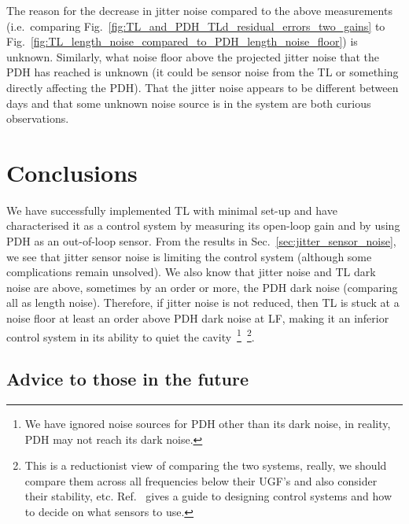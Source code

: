\documentclass[aps,pra,superscriptaddress,reprint,nofootinbib]{revtex4-1}
\begin{document}
The reason for the decrease in jitter noise compared to the above measurements (i.e.\ comparing Fig.~\ref{fig:TL_and_PDH_TLd_residual_errors_two_gains} to Fig.~\ref{fig:TL_length_noise_compared_to_PDH_length_noise_floor}) is unknown. Similarly, what noise floor above the projected jitter noise that the PDH has reached is unknown (it could be sensor noise from the TL or something directly affecting the PDH). That the jitter noise appears to be different between days and that some unknown noise source is in the system are both curious observations.


\section{Conclusions}
\label{sec:conclusions}

We have successfully implemented TL with minimal set-up and have characterised it as a control system by measuring its open-loop gain and by using PDH as an out-of-loop sensor. From the results in Sec.~\ref{sec:jitter_sensor_noise}, we see that jitter sensor noise is limiting the control system (although some complications remain unsolved). We also know that jitter noise and TL dark noise are above, sometimes by an order or more, the PDH dark noise (comparing all as length noise).
Therefore, if jitter noise is not reduced, then TL is stuck at a noise floor at least an order above PDH dark noise at LF, making it an inferior control system in its ability to quiet the cavity~\footnote{We have ignored noise sources for PDH other than its dark noise, in reality, PDH may not reach its dark noise.}~\footnote{This is a reductionist view of comparing the two systems, really, we should compare them across all frequencies below their UGF’s and also consider their stability, etc. Ref.~\cite{FCS:2000} gives a guide to designing control systems and how to decide on what sensors to use.}.

\subsection{Advice to those in the future}
\end{document}
